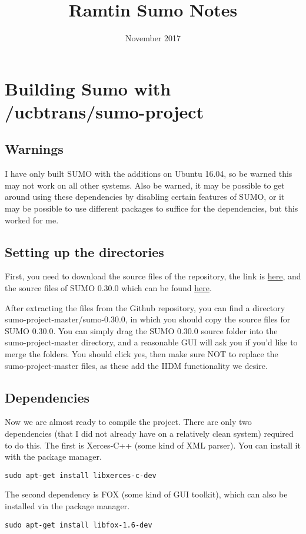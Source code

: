 \documentclass{article}
\title{Ramtin Sumo Notes}
\author{ }
\date{November 2017}
\begin{document}
\maketitle

\section{Building Sumo with /ucbtrans/sumo-project}

\subsection{Warnings}
I have only built SUMO with the additions on Ubuntu 16.04, so be warned this may not work on all other systems. Also be warned, it may be possible to get around using these dependencies by disabling certain features of SUMO, or it may be possible to use different packages to suffice for the dependencies, but this worked for me.

\subsection{Setting up the directories}
First, you need to download the source files of the repository, the link is \href{https://github.com/ucbtrans/sumo-project}{here}, and the source files of SUMO 0.30.0 which can be found  \href{https://sourceforge.net/projects/sumo/files/sumo/version%200.30.0/}{here}.

After extracting the files from the Github repository, you can find a directory sumo-project-master/sumo-0.30.0, in which you should copy the source files for SUMO 0.30.0. You can simply drag the SUMO 0.30.0 source folder into the sumo-project-master directory, and a reasonable GUI will ask you if you'd like to merge the folders. You should click yes, then make sure NOT to replace the sumo-project-master files, as these add the IIDM functionality we desire.

\subsection{Dependencies}
Now we are almost ready to compile the project. There are only two dependencies (that I did not already have on a relatively clean system) required to do this. The first is Xerces-C++ (some kind of XML parser). You can install it with the package manager. 
\begin{lstlisting}
sudo apt-get install libxerces-c-dev
\end{lstlisting}
 The second dependency is FOX (some kind of GUI toolkit), which can also be installed via the package manager.
\begin{lstlisting}
sudo apt-get install libfox-1.6-dev
\end{lstlisting}
\end{document}
